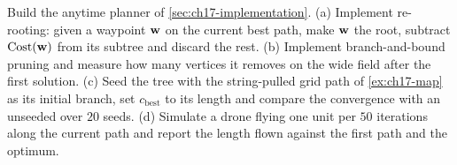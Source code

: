 \begin{exercise}[\difficulty{3}]
\label{exr:ch17-anytime}
Build the anytime planner of \cref{sec:ch17-implementation}. (a) Implement
re-rooting: given a waypoint $\mathbf{w}$ on the current best path, make
$\mathbf{w}$ the root, subtract $\mathrm{Cost}(\mathbf{w})$ from its subtree and
discard the rest.
(b) Implement branch-and-bound pruning and measure how many vertices it
removes on the wide field after the first solution. (c) Seed the tree with
the string-pulled grid path of \cref{ex:ch17-map} as its initial branch,
set $c_{\mathrm{best}}$ to its length and compare the convergence with an
unseeded \irrtstar over $20$ seeds. (d) Simulate a drone flying one unit per $50$ iterations along the current
path and report the length flown against the first path and the optimum.
\end{exercise}
